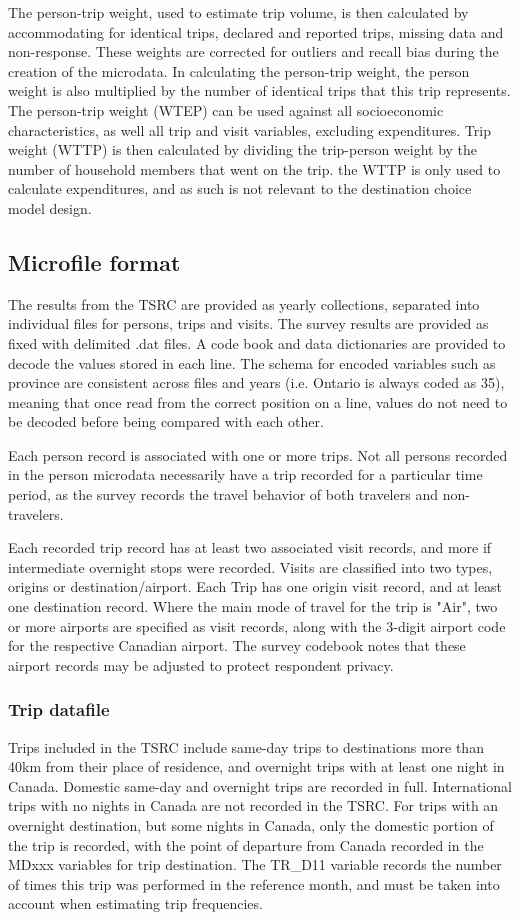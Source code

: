 The person-trip weight, used to estimate trip volume, is then calculated by accommodating for identical trips, declared and reported trips, missing data and non-response. These weights are corrected for outliers and recall bias during the creation of the microdata. In calculating the person-trip weight, the person weight is also multiplied by the number of identical trips that this trip represents. The person-trip weight (WTEP) can be used against all socioeconomic characteristics, as well all trip and visit variables, excluding expenditures. Trip weight (WTTP) is then calculated by dividing the trip-person weight by the number of household members that went on the trip. the WTTP is only used to calculate expenditures, and as such is not relevant to the destination choice model design. 

\subsection{Microfile format}
The results from the TSRC are provided as yearly collections, separated into individual files for persons, trips and visits. The survey results are provided as fixed with delimited .dat files. A code book and data dictionaries are provided to decode the values stored in each line. The schema for encoded variables such as province are consistent across files and years (i.e. Ontario is always coded as 35), meaning that once read from the correct position on a line, values do not need to be decoded before being compared with each other. 

Each person record is associated with one or more trips. Not all persons recorded in the person microdata necessarily have a trip recorded for a particular time period, as the survey records the travel behavior of both travelers and non-travelers.

Each recorded trip record has at least two associated visit records, and more if intermediate overnight stops were recorded. Visits are classified into two types, origins or destination/airport. Each Trip has one origin visit record, and at least one destination record. Where the main mode of travel for the trip is "Air", two or more airports are specified as visit records, along with the 3-digit airport code for the respective Canadian airport. The survey codebook notes that these airport records may be adjusted to protect respondent privacy.

\subsubsection*{Trip datafile}
Trips included in the TSRC include same-day trips to destinations more than 40km from their place of residence, and overnight trips with at least one night in Canada. Domestic same-day and overnight trips are recorded in full. International trips with no nights in Canada are not recorded in the TSRC. For trips with an overnight destination, but some nights in Canada, only the domestic portion of the trip is recorded, with the point of departure from Canada recorded in the MDxxx variables for trip destination. The TR\_D11 variable records the number of times this trip was performed in the reference month, and must be taken into account when estimating trip frequencies.

